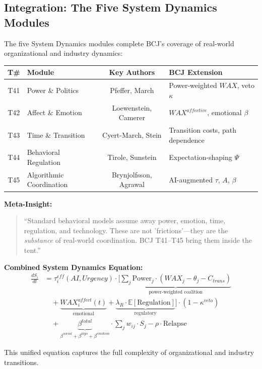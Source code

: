 \subsection{Integration: The Five System Dynamics Modules}

\begin{tcolorbox}[colback=gray!5!white, colframe=gray!75!black,
    title=Summary: System Dynamics Expansion (T41--T45)]

The five System Dynamics modules complete BCJ's coverage of real-world organizational and industry dynamics:

\begin{center}
\begin{tabular}{clcl}
\toprule
\textbf{T\#} & \textbf{Module} & \textbf{Key Authors} & \textbf{BCJ Extension} \\
\midrule
T41 & Power \& Politics & Pfeffer, March & Power-weighted $WAX$, veto $\kappa$ \\
T42 & Affect \& Emotion & Loewenstein, Camerer & $WAX^{affective}$, emotional $\beta$ \\
T43 & Time \& Transition & Cyert-March, Stein & Transition costs, path dependence \\
T44 & Behavioral Regulation & Tirole, Sunstein & Expectation-shaping $\Psi$ \\
T45 & Algorithmic Coordination & Brynjolfsson, Agrawal & AI-augmented $\tau$, $A$, $\beta$ \\
\bottomrule
\end{tabular}
\end{center}

\textbf{Meta-Insight:}
\begin{quote}
``Standard behavioral models assume away power, emotion, time, regulation, and technology. These are not 'frictions'---they are the \textit{substance} of real-world coordination. BCJ T41--T45 bring them inside the tent.''
\end{quote}

\textbf{Combined System Dynamics Equation:}
\begin{align}
\frac{dS_i}{dt} &= \tau_i^{eff}(AI, Urgency) \cdot \Bigg[
\underbrace{\sum_j \text{Power}_j \cdot (WAX_j - \theta_j - C_{trans})}_{\text{power-weighted coalition}} \\
&\quad + \underbrace{WAX_i^{affect}(t)}_{\text{emotional}} + \underbrace{\lambda_R \cdot \mathbb{E}[\text{Regulation}]}_{\text{regulatory}}
\Bigg] \cdot (1-\kappa^{veto}) \nonumber \\
&\quad + \underbrace{\beta^{total}}_{\beta^{social}+\beta^{algo}+\beta^{emotion}} \cdot \sum_j w_{ij} \cdot S_j - \rho \cdot \text{Relapse}
\end{align}

This unified equation captures the full complexity of organizational and industry transitions.
\end{tcolorbox}


